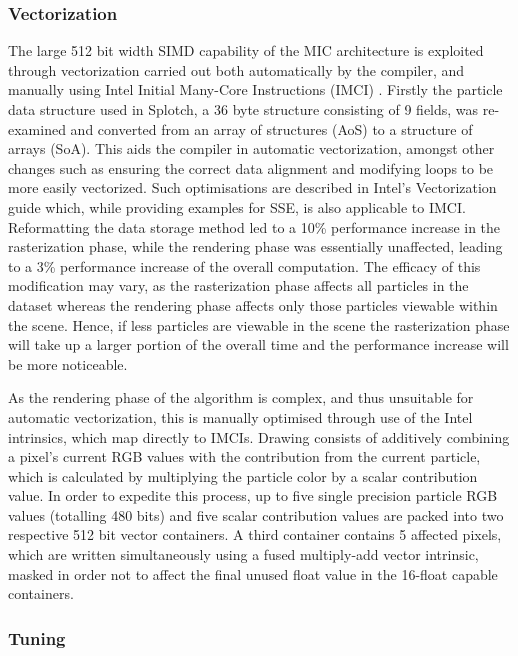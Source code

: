 \documentclass[runningheads,a4paper]{llncs}
\begin{document}
\subsubsection{Vectorization}
\label{sect:vectorization}

The large 512 bit width SIMD capability of the MIC architecture is exploited through vectorization carried out both 
automatically by the compiler, and manually using Intel Initial Many-Core Instructions (IMCI) \cite{imci}. Firstly the 
particle data structure used in Splotch, a 36 byte structure consisting of 9 fields, was re-examined and converted from an 
array of structures (AoS) to a structure of arrays (SoA). This aids the compiler in automatic vectorization, 
amongst other changes such as ensuring the correct data alignment and modifying loops to be more easily vectorized. 
Such optimisations are described in Intel's Vectorization guide \cite{vectorguide} which, while providing examples for SSE, is also 
applicable to IMCI. Reformatting the data storage method led to a 10\% performance increase in the rasterization phase, 
while the rendering phase was essentially unaffected, leading to a 3\% performance increase of the overall computation. 
The efficacy of this modification may vary, as the rasterization phase affects all particles in the dataset whereas the rendering phase 
affects only those particles viewable within the scene. Hence, if less particles are viewable in the scene the rasterization 
phase will take up a larger portion of the overall time and the performance increase will be more noticeable.

As the rendering phase of the algorithm is complex, and thus unsuitable for automatic vectorization, this is manually 
optimised through use of the Intel intrinsics, which map directly to IMCIs. Drawing consists of additively 
combining a pixel's current RGB values with the contribution from the current particle, which is calculated by 
multiplying the particle color by a scalar contribution value. In order to expedite this process, up to five single 
precision particle RGB values (totalling 480 bits) and five scalar contribution values are packed into two respective 
512 bit vector containers. A third container contains 5 affected pixels, which are written simultaneously using a 
fused multiply-add vector intrinsic, masked in order not to affect the final unused float value in the 16-float 
capable containers.

\subsubsection{Tuning}
\label{sect:tuning}
\end{document}
